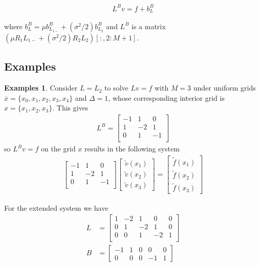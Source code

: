 \documentclass[11pt]{article}
\theoremstyle{definition}
\newtheorem{example}{Examples}[section]
\begin{document}
\begin{align}
L^B v = f + b^B_{L}
\end{align}

where $b^B_{L} = \mu b^B_{L_{1-}}+ (\sigma^2 / 2) b^B_{L_2}$ and $L^B$ is a matrix $\left( \mu R_1  L_{1-} + (\sigma^2/2) R_2 L_2 \right)[:,2:M+1] $.



\subsection{Examples}

\begin{example}\label{ex:gaussian-elimination-reflecting-barrier}
	Consider $L = L_{2}$ to solve $L v = f$ with $M = 3$ under uniform grids $\overline{x} = \{x_0, x_1, x_2, x_3, x_4\}$ and $\Delta = 1$, whose corresponding interior grid is $x = \{x_1, x_2, x_3\}$. This gives
	\begin{align}
	L^B = 	 \begin{bmatrix}
	-1 & 1 & 0 \\
	1 & -2 & 1 \\
	0 & 1 & -1 \\
	\end{bmatrix}
	\end{align}
	so $L^B v= f$ on the grid $x$ results in the following system
	\begin{align} \label{eq:extended-system-reflecting-barrier-reduced-system}
	\begin{bmatrix}
	-1 & 1 & 0  \\
	1 & -2 & 1 \\
	0 & 1 & -1 \\
	\end{bmatrix} 	  \begin{bmatrix}
	\tilde{v}(x_1) \\
	\tilde{v}(x_2) \\
	\tilde{v}(x_3)
	\end{bmatrix}
	=
	\begin{bmatrix}
	\tilde{f}(x_1) \\
	\tilde{f}(x_2) \\
	\tilde{f}(x_3)
	\end{bmatrix}
	\end{align}


	For the extended system we have
	\begin{align}
	{L} &=
	\begin{bmatrix}
	1 & -2 & 1 & 0 & 0 \\
	0 & 1 & -2 & 1 & 0 \\
	0 & 0 & 1 & -2 & 1 \\
	\end{bmatrix} \\
	B &= \begin{bmatrix}
	-1 & 1  & 0 & 0 & 0 \\
	0 & 0 & 0 & -1 & 1
	\end{bmatrix}
	\end{align}


\end{example}
\end{document}
